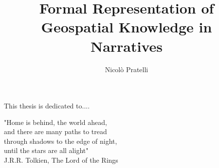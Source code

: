 \documentclass[a4,10pt,twoside,openright,italian,english]{book}%
\author{Nicolò Pratelli}
\title{Formal Representation of Geospatial Knowledge in Narratives}
\begin{document}

\maketitle

\pagestyle{empty}

\cleardoublepage
\newpage

\thispagestyle{empty}
    \null{}
        \begin{flushright}
                This thesis is dedicated to....
        \end{flushright}
\null

\cleardoublepage
\newpage

\pagestyle{empty}

\thispagestyle{empty}
    \null{}
        \begin{flushright}
                "Home is behind, the world ahead, \\
                and there are many paths to tread \\
                through shadows to the edge of night,\\
                until the stars are all alight"\\
                J.R.R. Tolkien, The Lord of the Rings
        \end{flushright}
\null
\end{document}
